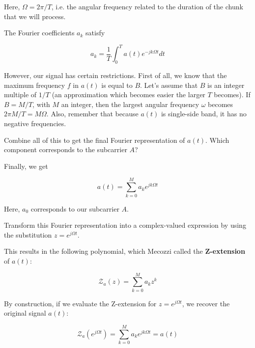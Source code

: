 \noindent{}Here, $\Omega=2 \pi / T$, i.e. the angular frequency related to the duration of the chunk that we will process.

The Fourier coefficients $a_k$ satisfy

\begin{equation}
a_k = \frac{1}{T} \int_0^T a(t) e ^{-jk\Omega t} dt
\end{equation}
    
However, our signal has certain restrictions. First of all, we know that the maximum frequency $f$ in $a(t)$ is equal to $B$. Let's assume that $B$ is an integer multiple of $1/T$ (an approximation which becomes easier the larger $T$ becomes). If $B=M/T$,  with $M$ an integer, then the largest angular frequency $\omega$ becomes $2 \pi M/T = M \Omega$. Also, remember that because $a(t)$ is single-side band, it has no negative frequencies.

\begin{cue}
Combine all of this to get the final Fourier representation of $a(t)$. Which component corresponds to the subcarrier $A$?
\end{cue}

Finally, we get

\begin{equation}
a(t) = \sum_{k=0}^M a_k e^{jk\Omega t}
\label{eq-a-fourier}
\end{equation}

Here, $a_0$ corresponds to our subcarrier $A$.

\begin{cue}
Transform this Fourier representation into a complex-valued expression by using the substitution $z=e^{j\Omega t}$.
\end{cue}

\noindent{}This results in the following polynomial, which Mecozzi called the \textbf{Z-extension} of $a(t)$:

\begin{equation}
\mathcal{Z}_a(z) = \sum_{k=0}^{M} a_k z^k
\end{equation}

By construction, if we evaluate the Z-extension for $z=e^{j\Omega t}$, we recover the original signal $a(t)$:

\begin{equation}
\mathcal{Z}_a\left(e^{j\Omega t}\right) = \sum_{k=0}^{M} a_k e^{j k \Omega t} = a(t)
\label{eq-z-a-recovery}
\end{equation}

